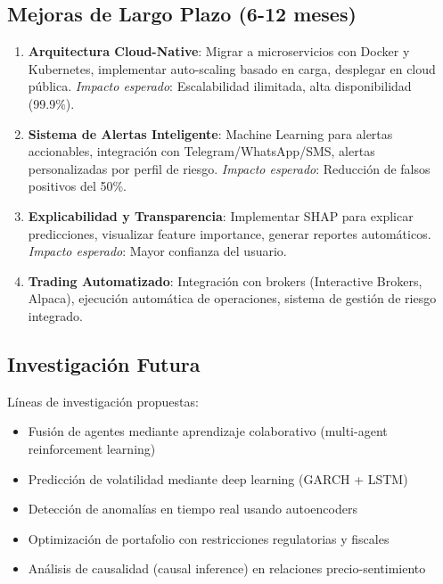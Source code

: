 \subsection{Mejoras de Largo Plazo (6-12 meses)}

\begin{enumerate}
    \item \textbf{Arquitectura Cloud-Native}: Migrar a microservicios con Docker y Kubernetes, implementar auto-scaling basado en carga, desplegar en cloud pública. \textit{Impacto esperado}: Escalabilidad ilimitada, alta disponibilidad (99.9\%).

    \item \textbf{Sistema de Alertas Inteligente}: Machine Learning para alertas accionables, integración con Telegram/WhatsApp/SMS, alertas personalizadas por perfil de riesgo. \textit{Impacto esperado}: Reducción de falsos positivos del 50\%.

    \item \textbf{Explicabilidad y Transparencia}: Implementar SHAP para explicar predicciones, visualizar feature importance, generar reportes automáticos. \textit{Impacto esperado}: Mayor confianza del usuario.

    \item \textbf{Trading Automatizado}: Integración con brokers (Interactive Brokers, Alpaca), ejecución automática de operaciones, sistema de gestión de riesgo integrado.
\end{enumerate}

\subsection{Investigación Futura}

Líneas de investigación propuestas:

\begin{itemize}
    \item Fusión de agentes mediante aprendizaje colaborativo (multi-agent reinforcement learning)
    \item Predicción de volatilidad mediante deep learning (GARCH + LSTM)
    \item Detección de anomalías en tiempo real usando autoencoders
    \item Optimización de portafolio con restricciones regulatorias y fiscales
    \item Análisis de causalidad (causal inference) en relaciones precio-sentimiento
\end{itemize}

